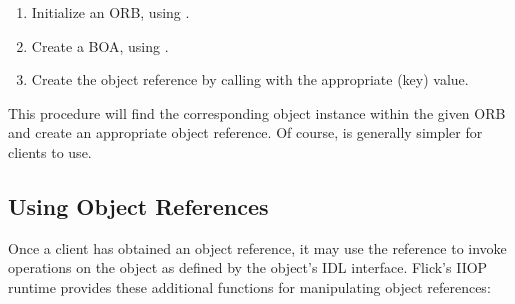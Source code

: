 \begin{enumerate}
  \item Initialize an ORB, using .

  \item Create a BOA, using .

  \item Create the object reference by calling 
  with the appropriate  (key) value.
\end{enumerate}

This procedure will find the corresponding object instance within the given ORB
and create an appropriate object reference.  Of course,
 is generally simpler for clients to use.



\subsection{Using Object References}
\label{subsec:Using Object References}

Once a client has obtained an object reference, it may use the reference to
invoke operations on the object as defined by the object's IDL interface.
Flick's IIOP runtime provides these additional functions for manipulating
object references:

